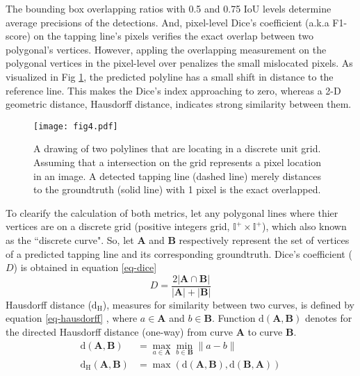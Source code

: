 \documentclass[default,pdflatex,iicol]{sn-jnl}%
\begin{document}
The bounding box overlapping ratios with 0.5 and 0.75 IoU levels determine average precisions of the detections. And, pixel-level Dice's coefficient (a.k.a F1-score) on the tapping line's pixels verifies the exact overlap between two polygonal's vertices. However, appling the overlapping measurement on the polygonal vertices in the pixel-level over penalizes the small mislocated pixels. As visualized in Fig \ref{fig4-polyline}, the predicted polyline has a small shift in distance to the reference line. This makes the Dice's index approaching to zero, whereas a 2-D geometric distance, Hausdorff distance, indicates strong similarity between them.

\begin{figure}[h]%
\centering
\texttt{[image: fig4.pdf]}
\caption{A drawing of two polylines that are locating in a discrete unit grid. Assuming that a intersection on the grid represents a pixel location in an image. A detected tapping line (dashed line) merely distances to the groundtruth (solid line) with 1 pixel is the exact overlapped.}\label{fig4-polyline}
\end{figure}

To clearify the calculation of both metrics, let any polygonal lines where thier vertices are on a discrete grid (positive integers grid, $\mathbb{I^+}\times \mathbb{I^+}$), which also known as the ``discrete curve". So, let $\textbf{A}$ and $\textbf{B}$ respectively represent the set of vertices of a predicted tapping line and its corresponding groundtruth. Dice's coefficient ($D$) is obtained in equation \ref{eq-dice}
\begin{equation}
D = \frac{2 \lvert \textbf{A} \cap \textbf{B} \rvert }{\lvert\textbf{A}\rvert+\lvert\textbf{B}\rvert}\label{eq-dice}
\end{equation}
Hausdorff distance ($\mathrm{d_H}$), measures for similarity between two curves, is defined by equation \ref{eq-hausdorff} \cite{Huttenlocher1993ComparingIU}, where $a \in \textbf{A}$ and $b \in \textbf{B}$. Function $\mathrm{d}(\textbf{A},\textbf{B})$ denotes for the directed Hausdorff distance (one-way) from curve \textbf{A} to curve \textbf{B}.
\begin{align}
\mathrm{d}(\textbf{A},\textbf{B}) &= \max_{a\in\textbf{A}} \min_{b\in\textbf{B}} \| a-b \|  \nonumber \\
\mathrm{d_H}(\textbf{A},\textbf{B}) &= \max (\mathrm{d}(\textbf{A},\textbf{B}), \mathrm{d}(\textbf{B},\textbf{A})) \label{eq-hausdorff}
\end{align}
\end{document}
